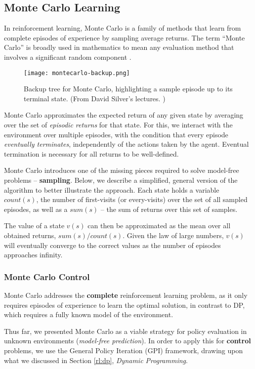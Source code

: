 \clearpage

\subsection{Monte Carlo Learning} \label{rl:mc}
In reinforcement learning, Monte Carlo is a family of methods that learn from complete episodes of experience by sampling average returns.
The term “Monte Carlo” is broadly used in mathematics to mean any evaluation method that involves a significant random component \cite{rlai}.

\begin{figure}[ht]
    \caption{Backup tree for Monte Carlo, highlighting a sample episode up to its terminal state. (From David Silver's lectures. \cite{silver-lectures})}
    \centering
    \texttt{[image: montecarlo-backup.png]}
\end{figure}

Monte Carlo approximates the expected return of any given state by averaging over the set of \emph{episodic returns} for that state.
For this, we interact with the environment over multiple episodes, with the condition that every episode \emph{eventually terminates}, independently of the actions taken by the agent.
Eventual termination is necessary for all returns to be well-defined.

Monte Carlo introduces one of the missing pieces required to solve model-free problems -- \textbf{sampling}.
Below, we describe a simplified, general version of the algorithm to better illustrate the approach.
Each state holds a variable $count(s)$, the number of first-visits (or every-visits) over the set of all sampled episodes, as well as a $sum(s)$ -- the sum of returns over this set of samples.

The value of a state $v(s)$ can then be approximated as the mean over all obtained returns, $sum(s) / count(s)$.
Given the law of large numbers, $v(s)$ will eventually converge to the correct values as the number of episodes approaches infinity.

\subsubsection{Monte Carlo Control}
Monte Carlo addresses the \textbf{complete} reinforcement learning problem, as it only requires episodes of experience to learn the optimal solution, in contrast to DP, which requires a fully known model of the environment.

Thus far, we presented Monte Carlo as a viable strategy for policy evaluation in unknown environments (\emph{model-free prediction}).
In order to apply this for \textbf{control} problems, we use the General Policy Iteration (GPI) framework, drawing upon what we discussed in Section \ref{rl:dp}, \emph{Dynamic Programming}.

